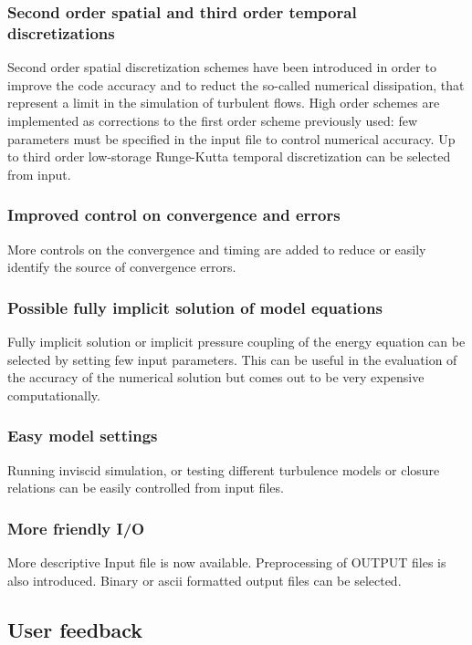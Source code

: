 \subsubsection*{Second order spatial and third order temporal discretizations}
Second order spatial discretization schemes have been introduced in order
to improve the code accuracy and to reduct the so-called numerical 
dissipation, that represent a limit in the simulation of turbulent flows.
High order schemes are implemented as corrections to the first order
scheme previously used: few parameters must be specified in the input
file to control numerical accuracy. Up to third order low-storage 
Runge-Kutta temporal discretization can be selected from input.

\subsubsection*{Improved control on convergence and errors}
More controls on the convergence and timing are added to reduce or
easily identify the source of convergence errors.

\subsubsection*{Possible fully implicit solution of model equations}
Fully implicit solution or implicit pressure coupling of the energy
equation can be selected by setting few input parameters. This can
be useful in the evaluation of the accuracy of the numerical solution
but comes out to be very expensive computationally.

\subsubsection*{Easy model settings}
Running inviscid simulation, or testing different turbulence models or closure 
relations can be easily controlled from input files.

\subsubsection*{More friendly I/O}
More descriptive Input file is now available. Preprocessing of OUTPUT files
is also introduced. Binary or ascii formatted output files can be selected.

\subsection{User feedback}

